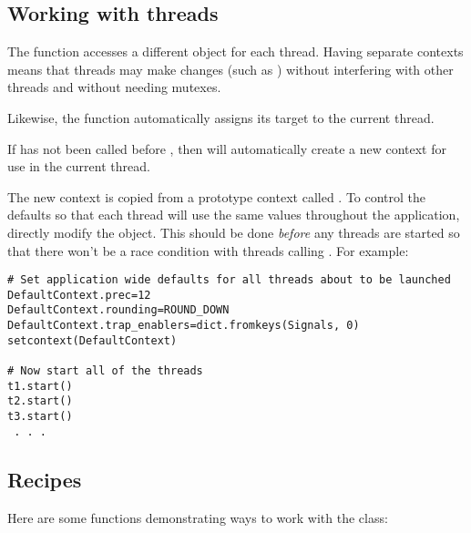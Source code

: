 \subsection{Working with threads \label{decimal-threads}}

The  function accesses a different 
object for each thread.  Having separate contexts means that threads may make
changes (such as ) without interfering with other
threads and without needing mutexes.

Likewise, the  function automatically assigns its target
to the current thread.

If  has not been called before ,
then  will automatically create a new context for use
in the current thread.

The new context is copied from a prototype context called .
To control the defaults so that each thread will use the same values
throughout the application, directly modify the  object.
This should be done \emph{before} any threads are started so that there won't
be a race condition with threads calling . For example:

\begin{verbatim}
# Set application wide defaults for all threads about to be launched
DefaultContext.prec=12
DefaultContext.rounding=ROUND_DOWN
DefaultContext.trap_enablers=dict.fromkeys(Signals, 0)
setcontext(DefaultContext)

# Now start all of the threads
t1.start()
t2.start()
t3.start()
 . . .
\end{verbatim}
 


\subsection{Recipes \label{decimal-recipes}}

Here are some functions demonstrating ways to work with the
 class:

